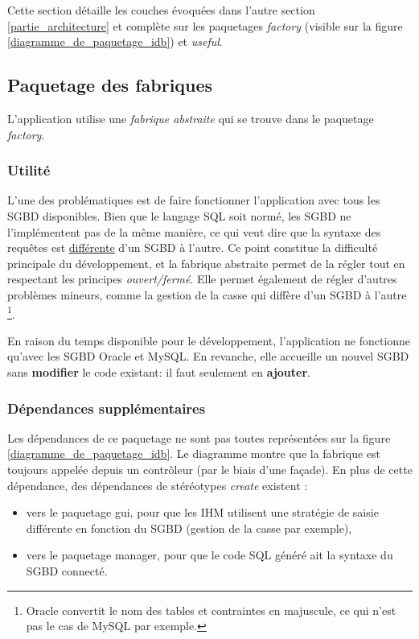 Cette section détaille les couches évoquées dans l'autre section \ref{partie_architecture} et complète sur les paquetages \textit{factory} (visible sur la figure \ref{diagramme_de_paquetage_idb}) et \textit{useful}.

\subsection{Paquetage des fabriques}
L'application utilise une \textit{fabrique abstraite} qui se trouve dans le paquetage \textit{factory}.

\subsubsection{Utilité}
L'une des problématiques est de faire fonctionner l'application avec tous les SGBD disponibles.
Bien que le langage SQL soit normé, les SGBD ne l'implémentent pas de la même manière, ce qui veut dire que la syntaxe des requêtes est \underline{différente} d'un SGBD à l'autre.
Ce point constitue la difficulté principale du développement, et la fabrique abstraite permet de la régler tout en respectant les principes \textit{ouvert/fermé}. Elle permet également de régler d'autres problèmes mineurs, comme la gestion de la casse qui diffère d'un SGBD à l'autre
\footnote{\label{casse_et_sgbd}Oracle convertit le nom des tables et contraintes en majuscule, ce qui n'est pas le cas de MySQL par exemple.}.

En raison du temps disponible pour le développement, l'application ne fonctionne qu'avec les SGBD Oracle et MySQL.
En revanche, elle accueille un nouvel SGBD sans \textbf{modifier} le code existant: il faut seulement en \textbf{ajouter}. %

\subsubsection{Dépendances supplémentaires}
Les dépendances de ce paquetage ne sont pas toutes représentées sur la figure \ref{diagramme_de_paquetage_idb}.
Le diagramme montre que la fabrique est toujours appelée depuis un contrôleur (par le biais d'une façade).
En plus de cette dépendance, des dépendances de stéréotypes \textit{create} existent :
\begin{itemize}
\item vers le paquetage gui, pour que les IHM utilisent une stratégie de saisie différente en fonction du SGBD (gestion de la casse par exemple),
\item vers le paquetage manager, pour que le code SQL généré ait la syntaxe du SGBD connecté.
\end{itemize}

